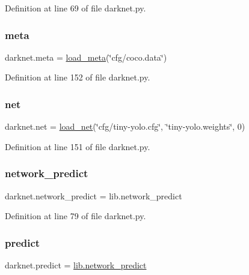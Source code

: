 Definition at line 69 of file darknet.\+py.

\mbox{\label{namespacedarknet_ae61a1edabe435136c755d64a6183a9c0}} 
\subsubsection{\texorpdfstring{meta}{meta}}
{\footnotesize\ttfamily darknet.\+meta = \mbox{\hyperlink{namespacedarknet_a967ea7e67a7760d5896e68e55ca2211a}{load\+\_\+meta}}(\char`\"{}cfg/coco.\+data\char`\"{})}



Definition at line 152 of file darknet.\+py.

\mbox{\label{namespacedarknet_adc6a45d045e33aea7cdb3d217a6a7d35}} 
\subsubsection{\texorpdfstring{net}{net}}
{\footnotesize\ttfamily darknet.\+net = \mbox{\hyperlink{namespacedarknet_aec4fa651fbaf4fa7a43642897d7763c0}{load\+\_\+net}}(\char`\"{}cfg/tiny-\/yolo.\+cfg\char`\"{}, \char`\"{}tiny-\/yolo.\+weights\char`\"{}, 0)}



Definition at line 151 of file darknet.\+py.

\mbox{\label{namespacedarknet_a3b055662e0f991bb29e2dedac571fd3b}} 
\subsubsection{\texorpdfstring{network\_predict}{network\_predict}}
{\footnotesize\ttfamily darknet.\+network\+\_\+predict = lib.\+network\+\_\+predict}



Definition at line 79 of file darknet.\+py.

\mbox{\label{namespacedarknet_af6de8015ea12cdd6c4fc75cde1e785df}} 
\subsubsection{\texorpdfstring{predict}{predict}}
{\footnotesize\ttfamily darknet.\+predict = \mbox{\hyperlink{network_8c_a90179d7287c26a987c4722b81ec9a579}{lib.\+network\+\_\+predict}}}



